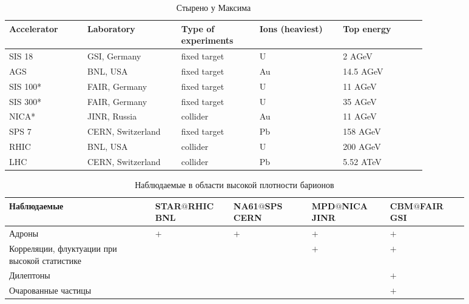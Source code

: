 \begin{table}[H]
\caption{Стырено у Максима}
\label{tabl:Accelerators}
\begin{tabular}{ | p{0.15\linewidth} | p{0.18\linewidth} | p{0.15\linewidth} | p{0.16\linewidth} | p{0.16\linewidth} | }
\hline
Accelerator & Laboratory & Type of experiments & Ions (heaviest) & Top energy \\
\hline
SIS 18 & GSI, Germany & fixed target & U & 2 AGeV \\
\hline
AGS & BNL, USA & fixed target & Au & 14.5 AGeV \\
\hline
SIS 100* & FAIR, Germany & fixed target & U & 11 AGeV \\
\hline
SIS 300* & FAIR, Germany & fixed target & U & 35 AGeV \\
\hline
NICA* & JINR, Russia & collider & Au & 11 AGeV \\
\hline
SPS 7 & CERN, Switzerland & fixed target & Pb & 158 AGeV \\
\hline
RHIC & BNL, USA & collider & U & 200 AGeV \\
\hline
LHC & CERN, Switzerland & collider & Pb & 5.52 ATeV \\
\hline
\end{tabular}
\end{table}


\todo


\begin{table}[H]
\caption{Наблюдаемые в области высокой плотности барионов}
\label{tabl:Experiments2}
\begin{tabular}{ | p{0.28\linewidth} | p{0.15\linewidth} | p{0.15\linewidth} | p{0.15\linewidth} | p{0.15\linewidth} | }
\hline
\textbf{Наблюдаемые} & \textbf{STAR$@$RHIC} \newline \textbf{BNL} & \textbf{NA61$@$SPS} \newline \textbf{CERN} & \textbf{MPD$@$NICA} \newline \textbf{JINR} & \textbf{CBM$@$FAIR} \newline \textbf{GSI} \\
\hline
Адроны & $+$ & $+$ & $+$ & $+$ \\
\hline
Корреляции, флуктуации \newline при высокой статистике & & & $+$ & $+$ \\
\hline
Дилептоны & & & & $+$ \\
\hline
Очарованные \newline частицы & & & & $+$ \\
\hline
\end{tabular}
\end{table}

